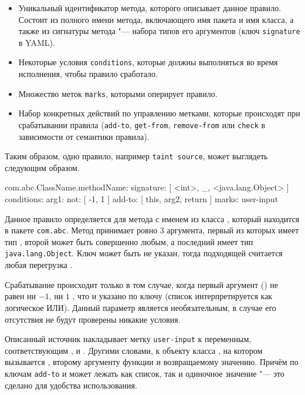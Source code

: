 \begin{itemize}
    \item Уникальный идентификатор метода, которого описывает данное правило. Состоит из полного имени метода, включающего имя пакета и имя класса, а также из сигнатуры метода "--- набора типов его аргументов (ключ \verb|signature| в YAML).
    \item Некоторые условия \verb|conditions|, которые должны выполняться во время исполнения, чтобы правило сработало.
    \item Множество меток \verb|marks|, которыми оперирует правило.
    \item Набор конкретных действий по управлению метками, которые происходят при срабатывании правила (\verb|add-to|, \verb|get-from|, \verb|remove-from| или \verb|check| в зависимости от семантики правила).
\end{itemize}

Таким образом, одно правило, например \verb|taint source|, может выглядеть следующим образом.

\begin{nocode}
com.abc.ClassName.methodName:
  signature: [ <int>, _, <java.lang.Object> ]
  conditions:
    arg1: 
      not: [ -1, 1 ]
  add-to: [ this, arg2, return ]
  marks: user-input
\end{nocode}

Данное правило определяется для метода с именем  из класса , который находится в пакете \verb|com.abc|. Метод принимает ровно $3$ аргумента, первый из которых имеет тип , второй может быть совершенно любым, а последний имеет тип \verb|java.lang.Object|. Ключ  может быть не указан, тогда подходящей считается любая перегрузка .

Срабатывание происходит только в том случае, когда первый аргумент () не равен ни $-1$, ни $1$ , что и указано по ключу  (список интерпретируется как логическое ИЛИ). Данный параметр является необязательным, в случае его отсутствия не будут проверены никакие условия. 

Описанный источник накладывает метку \verb|user-input| к переменным, соответствующим ,  и . Другими словами, к объекту класса , на котором вызывается , второму аргументу функции и возвращаемому значению. Причём по ключам \verb|add-to| и  может лежать как список, так и одиночное значение "--- это сделано для удобства использования.


